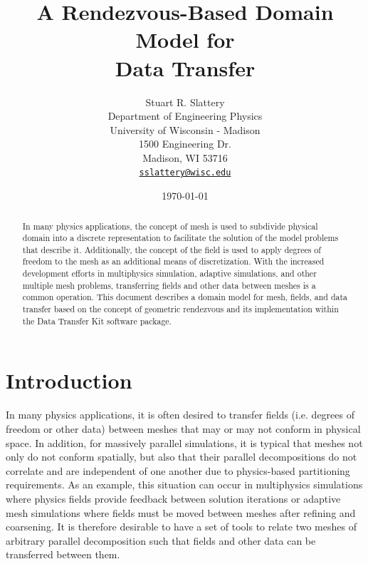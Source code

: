 \documentclass[letterpaper,12pt]{article}
\author{
  Stuart R. Slattery\\
  Department of Engineering Physics\\
  University of Wisconsin - Madison\\
  1500 Engineering Dr.\\
  Madison, WI 53716 \\
  \href{mailto:sslattery@wisc.edu}{\texttt{sslattery@wisc.edu}}
}
\date{\today}
\title{A Rendezvous-Based Domain Model for \\ Data Transfer}
\begin{document}
\maketitle

\newpage

\begin{abstract}
  In many physics applications, the concept of mesh is used to
  subdivide physical domain into a discrete representation to
  facilitate the solution of the model problems that describe
  it. Additionally, the concept of the field is used to apply degrees
  of freedom to the mesh as an additional means of
  discretization. With the increased development efforts in
  multiphysics simulation, adaptive simulations, and other multiple
  mesh problems, transferring fields and other data between meshes is
  a common operation. This document describes a domain model for mesh,
  fields, and data transfer based on the concept of geometric
  rendezvous and its implementation within the Data Transfer Kit
  software package.
\end{abstract}

\newpage
\newpage

\tableofcontents
\clearpage
\listoffigures
\clearpage
\listoftables
\newpage
\newpage

\section{Introduction}\label{sec:intro}
In many physics applications, it is often desired to transfer fields
(i.e. degrees of freedom or other data) between meshes that may or may
not conform in physical space. In addition, for massively parallel
simulations, it is typical that meshes not only do not conform
spatially, but also that their parallel decompositions do not
correlate and are independent of one another due to physics-based
partitioning requirements. As an example, this situation can occur in
multiphysics simulations where physics fields provide feedback between
solution iterations or adaptive mesh simulations where fields must be
moved between meshes after refining and coarsening. It is therefore
desirable to have a set of tools to relate two meshes of arbitrary
parallel decomposition such that fields and other data can be
transferred between them.
\end{document}
